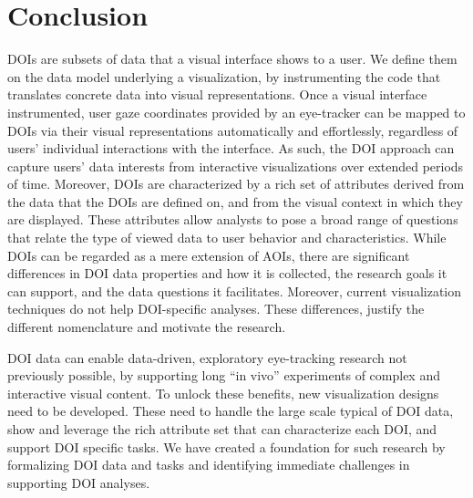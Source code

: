 \section{Conclusion}
\label{sec:DOIAnalysisModelConclusion}
DOIs are subsets of data that a visual interface shows to a user. We define them on the data model underlying a visualization, by instrumenting the code that translates concrete data into visual representations. Once a visual interface instrumented, user gaze coordinates provided by an eye-tracker can be mapped to DOIs via their visual representations automatically and effortlessly, regardless of users' individual interactions with the interface. As such, the DOI approach can capture users' data interests from interactive visualizations over extended periods of time. Moreover, DOIs are characterized by a rich set of attributes derived from the data that the DOIs are defined on, and from the visual context in which they are displayed. These attributes allow analysts to pose a broad range of questions that relate the type of viewed data to user behavior and characteristics. While DOIs can be regarded as a mere extension of AOIs, there are significant differences in DOI data properties and how it is collected, the research goals it can support, and the data questions it facilitates. Moreover, current visualization techniques do not help DOI-specific analyses. These differences, justify the different nomenclature and motivate the research.    

DOI data can enable data-driven, exploratory eye-tracking research not previously possible, by supporting long ``in vivo'' experiments of complex and interactive visual content. To unlock these benefits, new visualization designs need to be developed. These need to handle the large scale typical of DOI data, show and leverage the rich attribute set that can characterize each DOI, and support DOI specific tasks. We have created a foundation for such research by formalizing DOI data and tasks and identifying immediate challenges in supporting DOI analyses.